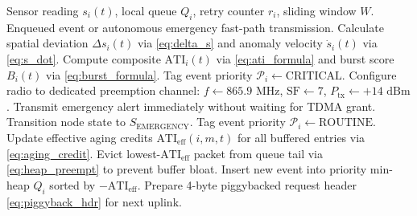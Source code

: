 \documentclass[preprint,review,12pt]{elsarticle}
\begin{document}
\begin{algorithm}[H]
\caption{Edge Node Threat Estimation and Priority Queuing}
\label{alg:node_edge}
\begin{algorithmic}[1]
\REQUIRE Sensor reading $s_i(t)$, local queue $Q_i$, retry counter $r_i$, sliding window $W$.
\ENSURE Enqueued event or autonomous emergency fast-path transmission.
\STATE Calculate spatial deviation $\Delta s_i(t)$ via \eqref{eq:delta_s} and anomaly velocity $\dot{s}_i(t)$ via \eqref{eq:s_dot}.
\STATE Compute composite $\text{ATI}_i(t)$ via \eqref{eq:ati_formula} and burst score $B_i(t)$ via \eqref{eq:burst_formula}.
    \STATE Tag event priority $\mathcal{P}_i \leftarrow \text{CRITICAL}$.
    \STATE Configure radio to dedicated preemption channel: $f \leftarrow 865.9\text{ MHz}$, $\text{SF} \leftarrow 7$, $P_{\text{tx}} \leftarrow +14\text{ dBm}$.
    \STATE Transmit emergency alert immediately without waiting for TDMA grant.
    \STATE Transition node state to $S_{\text{EMERGENCY}}$.
\ELSE
    \STATE Tag event priority $\mathcal{P}_i \leftarrow \text{ROUTINE}$.
    \STATE Update effective aging credits $\text{ATI}_{\text{eff}}(i, m, t)$ for all buffered entries via \eqref{eq:aging_credit}.
        \STATE Evict lowest-$\text{ATI}_{\text{eff}}$ packet from queue tail via \eqref{eq:heap_preempt} to prevent buffer bloat.
    \ENDIF
    \STATE Insert new event into priority min-heap $Q_i$ sorted by $-\text{ATI}_{\text{eff}}$.
    \STATE Prepare 4-byte piggybacked request header \eqref{eq:piggyback_hdr} for next uplink.
\ENDIF
\end{algorithmic}
\end{algorithm}
\end{document}
